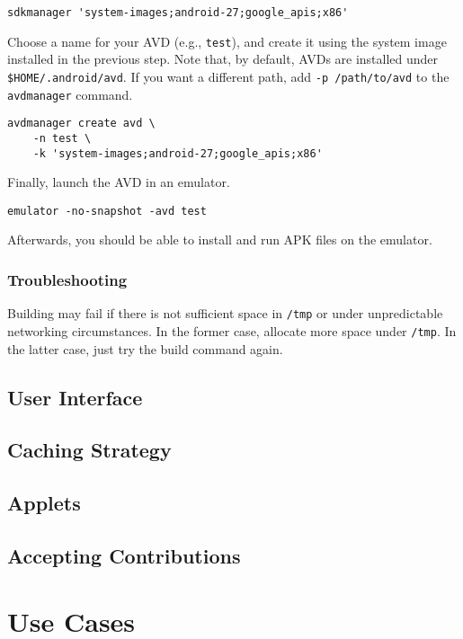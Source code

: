 \documentclass[12pt]{report}
\begin{document}
\begin{verbatim}
sdkmanager 'system-images;android-27;google_apis;x86'
\end{verbatim}

Choose a name for your AVD (e.g., \texttt{test}), and create it using the system
image installed in the previous step. Note that, by default, AVDs are installed
under \texttt{\$HOME/.android/avd}. If you want a different path, add \texttt{-p
/path/to/avd} to the \texttt{avdmanager} command.

\begin{verbatim}
avdmanager create avd \
    -n test \
    -k 'system-images;android-27;google_apis;x86'
\end{verbatim}

Finally, launch the AVD in an emulator.

\begin{verbatim}
emulator -no-snapshot -avd test
\end{verbatim}

Afterwards, you should be able to install and run APK files on the emulator.

        \subsection{Troubleshooting}

Building may fail if there is not sufficient space in \texttt{/tmp} or under
unpredictable networking circumstances. In the former case, allocate more space
under \texttt{/tmp}. In the latter case, just try the build command again.

    \section{User Interface}
    \section{Caching Strategy}
    \section{Applets}
    \section{Accepting Contributions}

\chapter{Use Cases}
\end{document}
